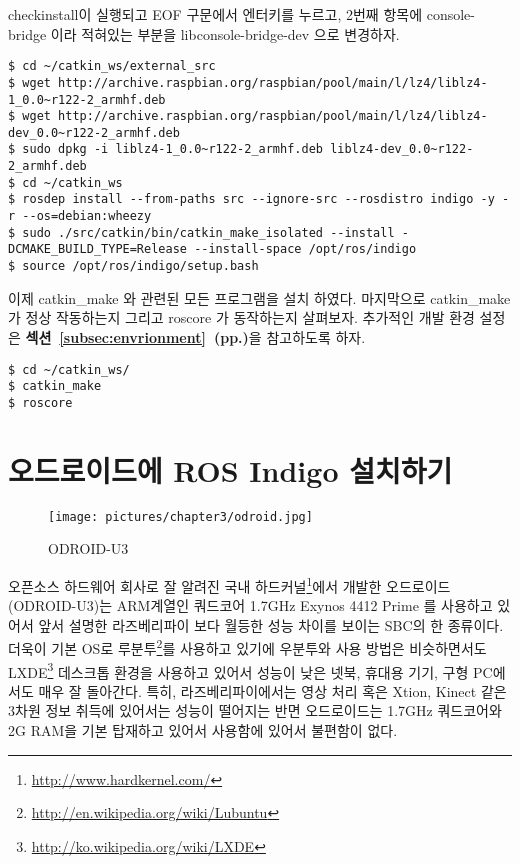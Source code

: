 checkinstall이 실행되고 EOF 구문에서 엔터키를 누르고, 2번째 항목에 console-bridge 이라 적혀있는 부분을 libconsole-bridge-dev 으로 변경하자.

\vspace{\baselineskip}
\begin{lstlisting}[language=ROS]
$ cd ~/catkin_ws/external_src
$ wget http://archive.raspbian.org/raspbian/pool/main/l/lz4/liblz4-1_0.0~r122-2_armhf.deb
$ wget http://archive.raspbian.org/raspbian/pool/main/l/lz4/liblz4-dev_0.0~r122-2_armhf.deb
$ sudo dpkg -i liblz4-1_0.0~r122-2_armhf.deb liblz4-dev_0.0~r122-2_armhf.deb
$ cd ~/catkin_ws
$ rosdep install --from-paths src --ignore-src --rosdistro indigo -y -r --os=debian:wheezy
$ sudo ./src/catkin/bin/catkin_make_isolated --install -DCMAKE_BUILD_TYPE=Release --install-space /opt/ros/indigo
$ source /opt/ros/indigo/setup.bash
\end{lstlisting}

이제 catkin\_make 와 관련된 모든 프로그램을 설치 하였다. 마지막으로 catkin\_make 가 정상 작동하는지 그리고 roscore 가 동작하는지 살펴보자. 추가적인 개발 환경 설정은 \textbf{섹션~\ref{subsec:envrionment}~(pp.\pageref{subsec:envrionment})}을 참고하도록 하자.

\vspace{\baselineskip}
\begin{lstlisting}[language=ROS]
$ cd ~/catkin_ws/
$ catkin_make
$ roscore
\end{lstlisting}

\newpage
\section{오드로이드에 ROS Indigo 설치하기}

\begin{figure}[h]
\centering\texttt{[image: pictures/chapter3/odroid.jpg]}
\caption{ODROID-U3}
\end{figure}

오픈소스 하드웨어 회사로 잘 알려진 국내 하드커널\footnote{\url{http://www.hardkernel.com/}}에서 개발한 오드로이드(ODROID-U3)는 ARM계열인 쿼드코어 1.7GHz Exynos 4412 Prime 를 사용하고 있어서 앞서 설명한 라즈베리파이 보다 월등한 성능 차이를 보이는 SBC의 한 종류이다. 더욱이 기본 OS로 루분투\footnote{\url{http://en.wikipedia.org/wiki/Lubuntu}}를 사용하고 있기에 우분투와 사용 방법은 비슷하면서도 LXDE\footnote{\url{http://ko.wikipedia.org/wiki/LXDE}} 데스크톱 환경을 사용하고 있어서 성능이 낮은 넷북, 휴대용 기기, 구형 PC에서도 매우 잘 돌아간다. 특히, 라즈베리파이에서는 영상 처리 혹은 Xtion, Kinect 같은 3차원 정보 취득에 있어서는 성능이 떨어지는 반면 오드로이드는 1.7GHz 쿼드코어와 2G RAM을 기본 탑재하고 있어서 사용함에 있어서 불편함이 없다.

